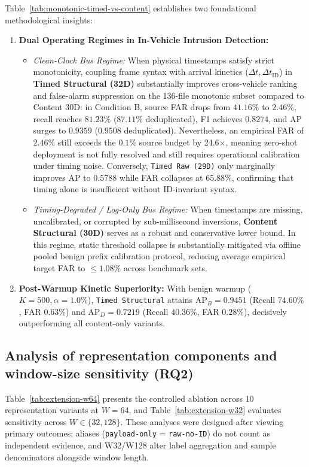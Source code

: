 \documentclass[12pt, a4paper, reqno, oneside]{book}
\DeclareRobustCommand{\code}[1]{\nolinkurl{#1}}
\begin{document}
Table~\ref{tab:monotonic-timed-vs-content} establishes two foundational methodological insights:
\begin{enumerate}
    \item \textbf{Dual Operating Regimes in In-Vehicle Intrusion Detection:}
    \begin{itemize}
        \item \textit{Clean-Clock Bus Regime:} When physical timestamps satisfy strict monotonicity, coupling frame syntax with arrival kinetics ($\Delta t, \Delta t_{\text{ID}}$) in \textbf{Timed Structural (32D)} substantially improves cross-vehicle ranking and false-alarm suppression on the 136-file monotonic subset compared to Content 30D: in Condition B, source FAR drops from $41.16\%$ to $\mathbf{2.46\%}$, recall reaches $\mathbf{81.23\%}$ ($87.11\%$ deduplicated), F1 achieves $0.8274$, and AP surges to $\mathbf{0.9359}$ ($0.9508$ deduplicated). Nevertheless, an empirical FAR of $2.46\%$ still exceeds the $0.1\%$ source budget by 24.6$\times$, meaning zero-shot deployment is not fully resolved and still requires operational calibration under timing noise. Conversely, \code{Timed Raw (29D)} only marginally improves AP to $0.5788$ while FAR collapses at $65.88\%$, confirming that timing alone is insufficient without ID-invariant syntax.
        \item \textit{Timing-Degraded / Log-Only Bus Regime:} When timestamps are missing, uncalibrated, or corrupted by sub-millisecond inversions, \textbf{Content Structural (30D)} serves as a robust and conservative lower bound. In this regime, static threshold collapse is substantially mitigated via offline pooled benign prefix calibration protocol, reducing average empirical target FAR to $\le 1.08\%$ across benchmark sets.
    \end{itemize}
    \item \textbf{Post-Warmup Kinetic Superiority:} With benign warmup ($K=500, \alpha=1.0\%$), \code{Timed Structural} attains $\text{AP}_B=0.9451$ (Recall $74.60\%$, FAR $0.63\%$) and $\text{AP}_D=0.7219$ (Recall $40.36\%$, FAR $0.28\%$), decisively outperforming all content-only variants.
\end{enumerate}

\subsection{Analysis of representation components and window-size sensitivity (RQ2)}\label{sec:completion}
Table~\ref{tab:extension-w64} presents the controlled ablation across 10 representation variants at $W=64$, and Table~\ref{tab:extension-w32} evaluates sensitivity across $W \in \{32, 128\}$. These analyses were designed after viewing primary outcomes; aliases (\code{payload-only} = \code{raw-no-ID}) do not count as independent evidence, and W32/W128 alter label aggregation and sample denominators alongside window length.
\end{document}
